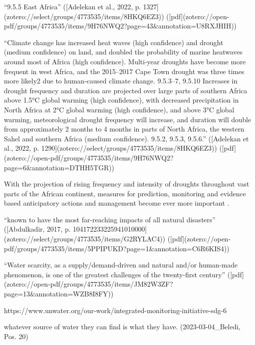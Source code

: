 “9.5.5 East Africa” ([Adelekan et al., 2022, p. 1327](zotero://select/groups/4773535/items/8HKQ6EZ3)) ([pdf](zotero://open-pdf/groups/4773535/items/9H76NWQ2?page=43&annotation=U8RXJHIH))

“Climate change has increased heat waves (high confidence) and drought (medium confidence) on land, and doubled the probability of marine heatwaves around most of Africa (high confidence). Multi-year droughts have become more frequent in west Africa, and the 2015–2017 Cape Town drought was three times more likely2 due to human-caused climate change. {9.5.3–7, 9.5.10} Increases in drought frequency and duration are projected over large parts of southern Africa above 1.5°C global warming (high confidence), with decreased precipitation in North Africa at 2°C global warming (high confidence), and above 3°C global warming, meteorological drought frequency will increase, and duration will double from approximately 2 months to 4 months in parts of North Africa, the western Sahel and southern Africa (medium confidence). {9.5.2, 9.5.3, 9.5.6.}” ([Adelekan et al., 2022, p. 1290](zotero://select/groups/4773535/items/8HKQ6EZ3)) ([pdf](zotero://open-pdf/groups/4773535/items/9H76NWQ2?page=6&annotation=DTHH5TGR))



With the projection of rising frequency and intensity of droughts throughout vast parts of the African continent, measures for prediction, monitoring and evidence based anticipatory actions and management become ever more important \autocite{abdulkadirAssessmentDroughtRecurrence2017,adelekanAfricaClimateChange2022,vereintenationenSpecialReportDrought2021}.

“known to have the most far-reaching impacts of all natural disasters” ([Abdulkadir, 2017, p. 104172233225941010000](zotero://select/groups/4773535/items/G2RYLAC4)) ([pdf](zotero://open-pdf/groups/4773535/items/5PPIPUKD?page=1&annotation=C6R6KIS4))


“Water scarcity, as a supply/demand-driven and natural and/or human-made phenomenon, is one of the greatest challenges of the twenty-first century” ([pdf](zotero://open-pdf/groups/4773535/items/JM82W3ZF?page=13&annotation=WZB8I8FY))

https://www.unwater.org/our-work/integrated-monitoring-initiative-sdg-6

whatever source of water they can find is what they have. (2023-03-04_Beledi, Pos. 20)


